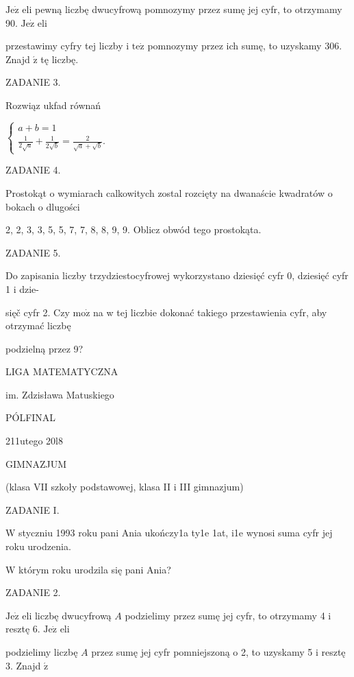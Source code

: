\documentclass[a4paper,12pt]{article}
\begin{document}
$\mathrm{J}\mathrm{e}\dot{\mathrm{z}}$ eli pewną liczbę dwucyfrową pomnozymy przez sumę jej cyfr, to otrzymamy 90. $\mathrm{J}\mathrm{e}\dot{\mathrm{z}}$ eli

przestawimy cyfry tej liczby i $\mathrm{t}\mathrm{e}\dot{\mathrm{z}}$ pomnozymy przez ich sumę, to uzyskamy 306. Znajd $\acute{\mathrm{z}}$ tę liczbę.

ZADANIE 3.

Rozwiąz ukfad równań

$\left\{\begin{array}{l}
a+b=1\\
\frac{1}{2\sqrt{a}}+\frac{1}{2\sqrt{b}}=\frac{2}{\sqrt{a}+\sqrt{b}}.
\end{array}\right.$

ZADANIE 4.

Prostokąt o wymiarach calkowitych zostal rozcięty na dwanaście kwadratów o bokach o dlugości

2, 2, 3, 3, 5, 5, 7, 7, 8, 8, 9, 9. Oblicz obwód tego prostokąta.

ZADANIE 5.

Do zapisania liczby trzydziestocyfrowej wykorzystano dziesięć cyfr 0, dziesięć cyfr 1 i dzie-

sięč cyfr 2. Czy $\mathrm{m}\mathrm{o}\dot{\mathrm{z}}$ na w tej liczbie dokonać takiego przestawienia cyfr, aby otrzymać liczbę

podzielną przez 9?






LIGA MATEMATYCZNA

im. Zdzisława Matuskiego

PÓLFINAL

211utego 20l8

GIMNAZJUM

(klasa VII szkoły podstawowej, klasa II i III gimnazjum)

ZADANIE I.

$\mathrm{W}$ styczniu 1993 roku pani Ania ukończy1a ty1e 1at, i1e wynosi suma cyfr jej roku urodzenia.

$\mathrm{W}$ którym roku urodzila się pani Ania?

ZADANIE 2.

$\mathrm{J}\mathrm{e}\dot{\mathrm{z}}$ eli liczbę dwucyfrową $A$ podzielimy przez sumę jej cyfr, to otrzymamy 4 i resztę 6. $\mathrm{J}\mathrm{e}\dot{\mathrm{z}}$ eli

podzielimy liczbę $A$ przez sumę jej cyfr pomniejszoną o 2, to uzyskamy 5 i resztę 3. Znajd $\acute{\mathrm{z}}$
\end{document}
